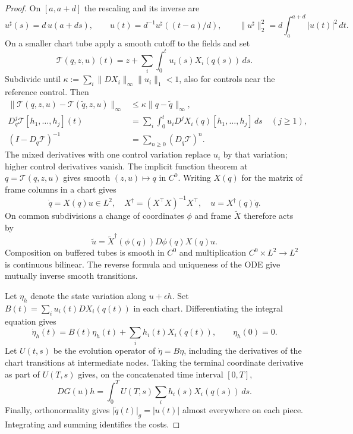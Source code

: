 \documentclass[11pt,letterpaper]{article}
\begin{document}
\begin{proof}
On $[a,a+d]$ the rescaling and its inverse are
\[
 u^\sharp(s)=d\,u(a+ds),\qquad u(t)=d^{-1}u^\sharp((t-a)/d),
 \qquad \|u^\sharp\|_2^2=d\int_a^{a+d}|u(t)|^2\,dt .
\]
On a smaller chart tube apply a smooth cutoff to the fields and set
\[
 \mathcal T(q,z,u)(t)=z+\sum_i\int_0^t u_i(s)X_i(q(s))\,ds .
\]
Subdivide until $\kappa:=\sum_i\|DX_i\|_\infty\|u_i\|_1<1$, also for
controls near the reference control. Then
\[
 \begin{aligned}
 \|\mathcal T(q,z,u)-\mathcal T(\tilde q,z,u)\|_\infty
       &\le\kappa\|q-\tilde q\|_\infty,\\
 D_q^j\mathcal T[h_1,\ldots,h_j](t)
       &=\sum_i\int_0^t u_i D^jX_i(q)[h_1,\ldots,h_j]\,ds
                  \quad(j\ge1),\\
 (I-D_q\mathcal T)^{-1}&=\sum_{n\ge0}(D_q\mathcal T)^n .
 \end{aligned}
\]
The mixed derivatives with one control variation replace $u_i$ by that
variation; higher control derivatives vanish. The implicit function theorem
at $q=\mathcal T(q,z,u)$ gives smooth $(z,u)\mapsto q$ in $C^0$.
Writing $X(q)$ for the matrix of frame columns in a chart gives
\[
 \dot q=X(q)u\in L^2,\quad
 X^\dagger=(X^\top X)^{-1}X^\top,\quad u=X^\dagger(q)\dot q .
\]
On common subdivisions a change of coordinates $\phi$ and frame $\widetilde X$
therefore acts by
\[
 \widetilde u=\widetilde X^\dagger(\phi(q))D\phi(q)X(q)u .
\]
Composition on buffered tubes is smooth in $C^0$ and multiplication
$C^0\times L^2\to L^2$ is continuous bilinear. The reverse formula and
uniqueness of the ODE give mutually inverse smooth transitions.

Let $\eta_h$ denote the state variation along $u+\epsilon h$.
Set $B(t)=\sum_i u_i(t)DX_i(q(t))$ in each chart. Differentiating the
integral equation gives
\begin{equation}\label{linearstate}
 \dot\eta_h(t)=B(t)\eta_h(t)+\sum_i h_i(t)X_i(q(t)),\qquad \eta_h(0)=0 .
\end{equation}
Let $U(t,s)$ be the evolution operator of $\dot\eta=B\eta$, including the
derivatives of the chart transitions at intermediate nodes. Taking the
terminal coordinate derivative as part of $U(T,s)$ gives, on the concatenated
time interval $[0,T]$,
\begin{equation}\label{firstvariation}
 DG(u)h=\int_0^T U(T,s)\sum_i h_i(s)X_i(q(s))\,ds .
\end{equation}
Finally, orthonormality gives $|\dot q(t)|_g=|u(t)|$ almost everywhere on
each piece. Integrating and summing identifies the costs.
\end{proof}
\end{document}

